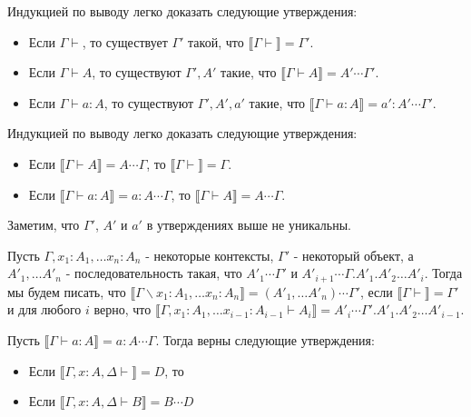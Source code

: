 \documentclass{amsart}
\theoremstyle{definition}
\theoremstyle{remark}
\renewcommand{\ll}{\llbracket}
\newcommand{\rr}{\rrbracket}
\numberwithin{figure}{section}
\begin{document}
Индукцией по выводу легко доказать следующие утверждения:
\begin{itemize}
\item Если $\Gamma \vdash$, то существует $\Gamma'$ такой, что $\ll \Gamma \vdash \rr = \Gamma'$.
\item Если $\Gamma \vdash A$, то существуют $\Gamma', A'$ такие, что $\ll \Gamma \vdash A \rr = A' \dotsb \Gamma'$.
\item Если $\Gamma \vdash a : A$, то существуют $\Gamma', A', a'$ такие, что $\ll \Gamma \vdash a : A \rr = a' : A' \dotsb \Gamma'$.
\end{itemize}

Индукцией по выводу легко доказать следующие утверждения:
\begin{itemize}
\item Если $\ll \Gamma \vdash A \rr = A \dotsb \Gamma$, то $\ll \Gamma \vdash \rr = \Gamma$.
\item Если $\ll \Gamma \vdash a : A \rr = a : A \dotsb \Gamma$, то $\ll \Gamma \vdash A \rr = A \dotsb \Gamma$.
\end{itemize}

Заметим, что $\Gamma'$, $A'$ и $a'$ в утверждениях выше не уникальны.

Пусть $\Gamma, x_1 : A_1, \ldots x_n : A_n$ - некоторые контексты, $\Gamma'$ - некоторый объект, а $A'_1, \ldots A'_n$ - последовательность такая, что $A'_1 \dotsb \Gamma'$ и $A'_{i+1} \dotsb \Gamma.A'_1.A'_2 \ldots A'_i$.
Тогда мы будем писать, что $\ll \Gamma \backslash x_1 : A_1, \ldots x_n : A_n \rr = (A'_1, \ldots A'_n) \dotsb \Gamma'$, если $\ll \Gamma \vdash \rr = \Gamma'$ и для любого $i$ верно, что $\ll \Gamma, x_1 : A_1, \ldots x_{i-1} : A_{i-1} \vdash A_i \rr = A'_i \dotsb \Gamma'.A'_1.A'_2 \ldots A'_{i-1}$.

\begin{lem}
Пусть $\ll \Gamma \vdash a : A \rr = a : A \dotsb \Gamma$.
Тогда верны следующие утверждения:
\begin{itemize}
\item Если $\ll \Gamma, x : A, \Delta \vdash \rr = D$, то 
\item Если $\ll \Gamma, x : A, \Delta \vdash B \rr = B \dotsb D$
\end{itemize}
\end{lem}



\end{document}
